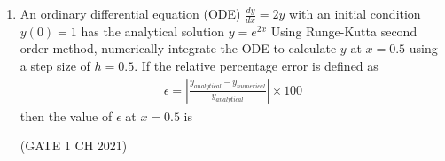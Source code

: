 \begin{enumerate}[label=\thechapter.\arabic*,ref=\thechapter.\theenumi]
\item An ordinary differential equation (ODE) $\frac{dy}{dx} = 2y$ with an initial condition $y(0) = 1$ has the analytical
solution $y = e^{2x}$
 Using Runge-Kutta second order method, numerically integrate the ODE to calculate $y$ at $x = 0.5$ using a
step size of $h = 0.5$.
 If the relative percentage error is defined as 
 \begin{align}
 \epsilon = \left|\frac{y_{analytical} - y_{numerical}}{y_{analytical}}\right| \times 100 \nonumber
 \end{align}
 then the value of $\epsilon$ at $x = 0.5$ is
 
\hfill(GATE 1 CH 2021)
\solution

\pagebreak
\end{enumerate}
